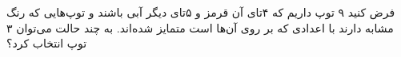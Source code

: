 \p
فرض کنید ۹ توپ داریم که ۴تای آن قرمز و ۵تای دیگر آبی باشند و توپ‌هایی که رنگ مشابه دارند با اعدادی که بر روی آن‌ها است متمایز شده‌اند. به چند حالت می‌توان ۳ توپ انتخاب کرد؟